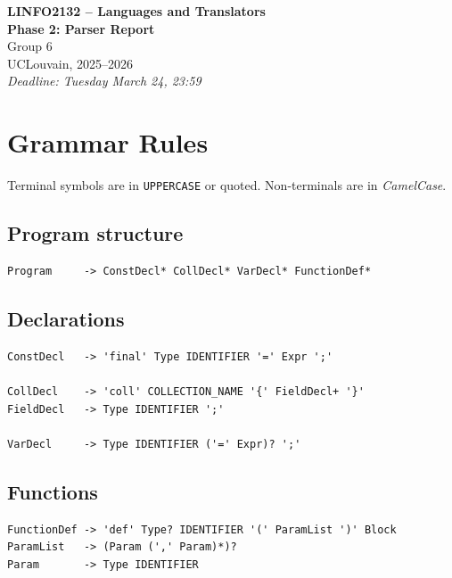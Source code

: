 \documentclass[12pt,a4paper]{article}
\begin{document}
\begin{titlepage}
    \centering
    \vspace*{2cm}
    {\LARGE \textbf{LINFO2132 -- Languages and Translators}\\[0.5cm]}
    {\Large \textbf{Phase 2: Parser Report}\\[2cm]}
    {\large Group 6\\[0.5cm]}
    {\large UCLouvain, 2025--2026\\[2cm]}
    \vfill
    {\small \textit{Deadline: Tuesday March 24, 23:59}}
\end{titlepage}

\section{Grammar Rules}

Terminal symbols are in \texttt{UPPERCASE} or quoted. Non-terminals are in \textit{CamelCase}.

\subsection{Program structure}

\begin{lstlisting}[style=grammar]
Program     -> ConstDecl* CollDecl* VarDecl* FunctionDef*
\end{lstlisting}

\subsection{Declarations}

\begin{lstlisting}[style=grammar]
ConstDecl   -> 'final' Type IDENTIFIER '=' Expr ';'

CollDecl    -> 'coll' COLLECTION_NAME '{' FieldDecl+ '}'
FieldDecl   -> Type IDENTIFIER ';'

VarDecl     -> Type IDENTIFIER ('=' Expr)? ';'
\end{lstlisting}

\subsection{Functions}

\begin{lstlisting}[style=grammar]
FunctionDef -> 'def' Type? IDENTIFIER '(' ParamList ')' Block
ParamList   -> (Param (',' Param)*)?
Param       -> Type IDENTIFIER
\end{lstlisting}
\end{document}
